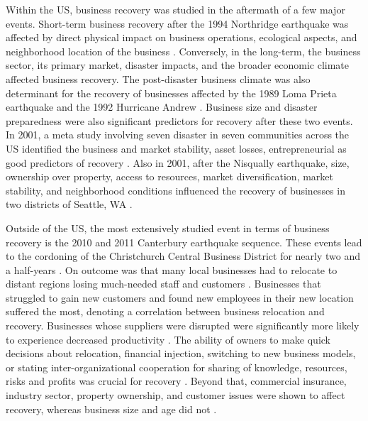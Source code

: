 Within the US, business recovery was studied in the aftermath of a few major events. Short-term business recovery after the 1994 Northridge earthquake was affected by direct physical impact on business operations, ecological aspects, and neighborhood location of the business \citep{dahlhamer1998rebounding}. Conversely, in the long-term, the business sector, its primary market, disaster impacts, and the broader economic climate affected business recovery. The post-disaster business climate was also determinant for the recovery of businesses affected by the 1989 Loma Prieta earthquake and the 1992 Hurricane Andrew \citep{webb2002predicting}. Business size and disaster preparedness were also significant predictors for recovery after these two events. In 2001, a meta study involving seven disaster in seven communities across the US identified the business and market stability, asset losses, entrepreneurial as good predictors of recovery \citep{alesch2001organizations}. Also in 2001, after the Nisqually earthquake, size, ownership over property, access to resources, market diversification, market stability, and neighborhood conditions influenced the recovery of businesses in two districts of Seattle, WA \citep{chang2002disaster}. \

Outside of the US, the most extensively studied event in terms of business recovery is the 2010 and 2011 Canterbury earthquake sequence. These events lead to the cordoning of the Christchurch Central Business District for nearly two and a half-years \citep{brown2019business}. On outcome was that many local businesses had to relocate to distant regions losing much-needed staff and customers \citep{morrish2020post}. Businesses that struggled to gain new customers and found new employees in their new location suffered the most, denoting a correlation between business relocation and recovery. Businesses whose suppliers were disrupted were significantly more likely to experience decreased productivity \citep{brown2019business}. The ability of owners to make quick decisions about relocation, financial injection, switching to new business models, or stating inter-organizational cooperation for sharing of knowledge, resources, risks and profits was crucial for recovery \citep{stevenson2014organizational,morrish2011entrepreneurial}. Beyond that, commercial insurance, industry sector, property ownership, and customer issues were shown to affect recovery, whereas business size and age did not \citep{brown2017efficacy,brown2015factors, kachali2015industry}. \

